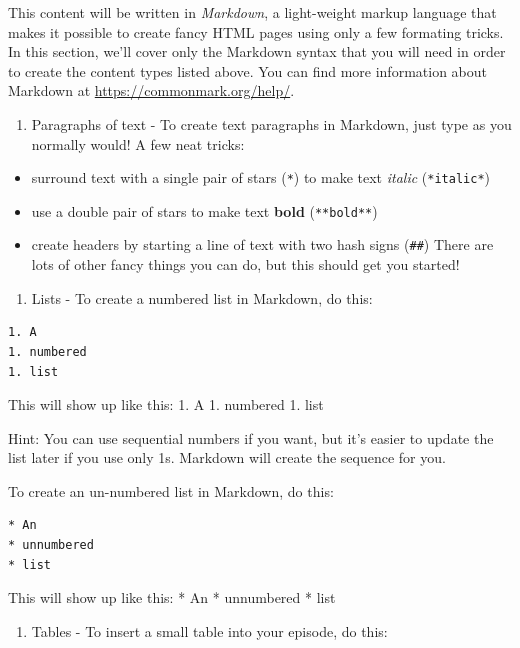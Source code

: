 \documentclass[]{book}
\providecommand{\tightlist}{%
  \setlength{\itemsep}{0pt}\setlength{\parskip}{0pt}}
\begin{document}
This content will be written in \emph{Markdown}, a light-weight markup language that makes it possible to create
fancy HTML pages using only a few formating tricks. In this section, we'll cover only the Markdown syntax that
you will need in order to create the content types listed above. You can find more information about Markdown
at \url{https://commonmark.org/help/}.

\begin{enumerate}
\def\labelenumi{\arabic{enumi}.}
\tightlist
\item
  Paragraphs of text - To create text paragraphs in Markdown, just type as you normally would! A few neat tricks:
\end{enumerate}

\begin{itemize}
\tightlist
\item
  surround text with a single pair of stars (\texttt{*}) to make text \emph{italic} (\texttt{*italic*})
\item
  use a double pair of stars to make text \textbf{bold} (\texttt{**bold**})
\item
  create headers by starting a line of text with two hash signs (\texttt{\#\#})
  There are lots of other fancy things you can do, but this should get you started!
\end{itemize}

\begin{enumerate}
\def\labelenumi{\arabic{enumi}.}
\tightlist
\item
  Lists - To create a numbered list in Markdown, do this:
\end{enumerate}

\begin{verbatim}
1. A
1. numbered
1. list
\end{verbatim}

This will show up like this:
1. A
1. numbered
1. list

Hint: You can use sequential numbers if you want, but it's easier to update the list later if you use only 1s.
Markdown will create the sequence for you.

To create an un-numbered list in Markdown, do this:

\begin{verbatim}
* An
* unnumbered
* list
\end{verbatim}

This will show up like this:
* An
* unnumbered
* list

\begin{enumerate}
\def\labelenumi{\arabic{enumi}.}
\tightlist
\item
  Tables - To insert a small table into your episode, do this:
\end{enumerate}
\end{document}
